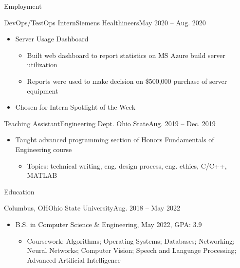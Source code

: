 \documentclass[calibri]{my-resume}
\begin{document}
\begin{cvsection}{Employment}
		\begin{cvsubsection}{DevOps/TestOps Intern}{Siemens Healthineers}{May 2020 -- Aug. 2020}
			\begin{itemize}
				\item Server Usage Dashboard
				\begin{itemize}
					\item Built web dashboard to report statistics on MS Azure build server utilization
					\item Reports were used to make decision on \$500,000 purchase of server equipment
				\end{itemize}
				\item Chosen for Intern Spotlight of the Week
			\end{itemize}
		\end{cvsubsection}

		\begin{cvsubsection}{Teaching Assistant}{Engineering Dept. Ohio State}{Aug. 2019 -- Dec. 2019}
			\begin{itemize}
				\item Taught advanced programming section of Honors Fundamentals of Engineering course
				\begin{itemize}
					\item Topics: technical writing, eng. design process, eng. ethics, C/C++, MATLAB
				\end{itemize}
			\end{itemize}
		\end{cvsubsection}
	\end{cvsection}

	\begin{cvsection}{Education}
		\begin{cvsubsection}{Columbus, OH}{Ohio State University}{Aug. 2018 -- May 2022}
			\begin{itemize}
				\item B.S. in Computer Science \& Engineering, May 2022, GPA: 3.9
				\begin{itemize}
					\item Coursework: Algorithms; Operating Systems; Databases; Networking; Neural Networks; Computer Vision; Speech and Language Processing; Advanced Artificial Intelligence
				\end{itemize}
			\end{itemize}
		\end{cvsubsection}
	\end{cvsection}
\end{document}
